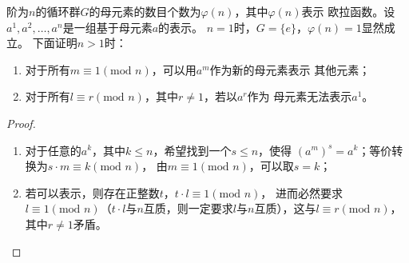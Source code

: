 \begin{solution}
    阶为$n$的循环群$G$的母元素的数目个数为$\varphi(n)$，其中$\varphi(n)$表示
    欧拉函数。设$a^1,a^2,\ldots,a^n$是一组基于母元素$a$的表示。
    $n=1$时，$G=\{e\}$，$\varphi(n)=1$显然成立。
    下面证明$n>1$时：
    \begin{enumerate}
        \item 对于所有$m \equiv 1 (\text{mod } n)$，可以用$a^m$作为新的母元素表示
        其他元素；
        \item 对于所有$l \equiv r (\text{mod } n)$，其中$r\neq 1$，若以$a^r$作为
        母元素无法表示$a^1$。
    \end{enumerate}
    \begin{proof}
        \begin{enumerate}
            \item 对于任意的$a^k$，其中$k\le n$，希望找到一个$s\le n$，使得
            $(a^m)^s=a^k$；等价转换为$s\cdot m \equiv k (\text{mod } n)$，
            由$m \equiv 1 (\text{mod } n)$，可以取$s= k$；
            \item 若可以表示，则存在正整数$t$，$t\cdot l \equiv 1 (\text{mod } n)$，
            进而必然要求$l \equiv 1 (\text{mod } n)$（$t\cdot l$与$n$互质，则一定要求$l$与$n$互质），这与$l \equiv r (\text{mod } n)$，
            其中$r\neq 1$矛盾。
        \end{enumerate}
    \end{proof}
\end{solution}